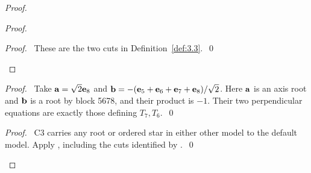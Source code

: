 \begin{proof}
\begin{proof}
  \qedstep
  \begin{proof}\pf\ These are the two cuts in Definition~\ref{def:3.3}.~\qed\end{proof}
 \end{proof}
 \begin{proof}\pf\ Take ${\mathbf a}=\sqrt2{\mathbf e}_8$ and
  ${\mathbf b}=-({\mathbf e}_5+{\mathbf e}_6+{\mathbf e}_7+{\mathbf e}_8)/\sqrt2$.
  Here ${\mathbf a}$ is an axis root and ${\mathbf b}$ is a root by block 5678, and their product is
  $-1$. Their two perpendicular
  equations are exactly those defining $T_7,T_6$.~\qed\end{proof}
 \qedstep
 \begin{proof}\pf\ C3 carries any root or ordered star in either other model to
  the default model. Apply , including the cuts identified
  by .~\qed\end{proof}
\end{proof}

